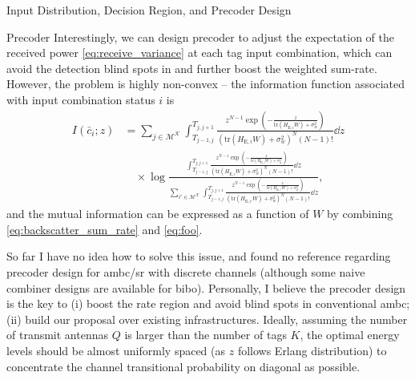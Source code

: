 \documentclass[journal]{IEEEtran}
\begin{document}
\begin{section}{Input Distribution, Decision Region, and Precoder Design}
		\begin{subsection}{Precoder}
			Interestingly, we can design precoder to adjust the expectation of the received power \eqref{eq:receive_variance} at each tag input combination, which can avoid the detection blind spots in \cite{Qian2019} and further boost the weighted sum-rate. However, the problem is highly non-convex -- the information function associated with input combination status $i$ is
			\begin{align}
				I(\bar{c}_i;z)
				& = \sum_{j \in \mathcal{M^K}} \int_{T_{j-1,j}}^{T_{j,j+1}} \frac{z^{N-1} \exp \left(-\frac{z}{\mathrm{tr}(H_{\mathrm{E},i} W) + \sigma_w^2}\right)}{\left(\mathrm{tr}(H_{\mathrm{E},i} W) + \sigma_w^2\right)^N (N-1)!} \dd z\nonumber\\
				& \quad \times \log \frac{\int_{T_{j-1,j}}^{T_{j,j+1}} \frac{z^{N-1} \exp \left(-\frac{z}{\mathrm{tr}(H_{\mathrm{E},i} W) + \sigma_w^2}\right)}{\left(\mathrm{tr}(H_{\mathrm{E},i} W) + \sigma_w^2\right)^N (N-1)!} \dd z}{\sum_{i' \in \mathcal{M^K}} \int_{T_{j-1,j}}^{T_{j,j+1}} \frac{z^{N-1} \exp \left(-\frac{z}{\mathrm{tr}(H_{\mathrm{E},i'} W) + \sigma_w^2}\right)}{\left(\mathrm{tr}(H_{\mathrm{E},i'} W) + \sigma_w^2\right)^N (N-1)!} \dd z},
				\label{eq:foo}
			\end{align}
			and the mutual information can be expressed as a function of $W$ by combining \eqref{eq:backscatter_sum_rate} and \eqref{eq:foo}.

			So far I have no idea how to solve this issue, and found no reference regarding precoder design for \gls{ambc}/\gls{sr} with discrete channels (although some naive combiner designs are available for \gls{bibo}). Personally, I believe the precoder design is the key to (i) boost the rate region and avoid blind spots in conventional \gls{ambc}; (ii) build our proposal over existing infrastructures. Ideally, assuming the number of transmit antennas $Q$ is larger than the number of tags $K$, the optimal energy levels should be almost uniformly spaced (as $z$ follows Erlang distribution) to concentrate the channel transitional probability on diagonal as possible.
		\end{subsection}
	\end{section}
\end{document}
